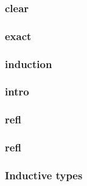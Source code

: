 \documentclass[a4paper,10pt,oneside]{report}%
\begin{document}
    \subsubsection{clear}
    \subsubsection{exact}
    \subsubsection{induction}
    \subsubsection{intro}
    \subsubsection{refl}
    \subsubsection{refl}
\subsubsection{Inductive types}
\end{document}
